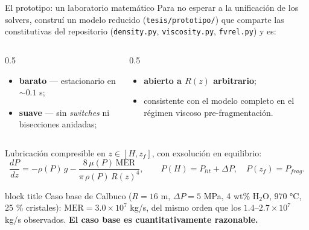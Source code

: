 \documentclass[aspectratio=169,10pt,t]{beamer}
\newcommand{\MER}{\mathrm{MER}}
\newcommand{\mensaje}[1]{%
  \vfill
  \begin{beamercolorbox}[wd=\linewidth,sep=0.4em,rounded=true]{block title}
  \footnotesize #1
  \end{beamercolorbox}}
\begin{document}
\begin{frame}{El prototipo: un laboratorio matemático}
Para no esperar a la unificación de los solvers, construí un \alert{modelo
reducido} (\texttt{tesis/prototipo/}) que comparte las constitutivas del
repositorio (\texttt{density.py}, \texttt{viscosity.py}, \texttt{fvrel.py}) y es:
\medskip
\begin{columns}[T]
\begin{column}{0.5\textwidth}
\begin{itemize}\small
  \item[(i)] \textbf{barato} — estacionario en $\sim0.1$ s;
  \item[(ii)] \textbf{suave} — sin \emph{switches} ni bisecciones anidadas;
\end{itemize}
\end{column}
\begin{column}{0.5\textwidth}
\begin{itemize}\small
  \item[(iii)] \textbf{abierto a $R(z)$ arbitrario};
  \item[(iv)] consistente con el modelo completo en el régimen viscoso
    pre-fragmentación.
\end{itemize}
\end{column}
\end{columns}
\medskip
Lubricación compresible en $z\in[H,z_f]$, con exsolución en equilibrio:
$$\frac{dP}{dz}=-\rho(P)\,g-\frac{8\,\mu(P)\,\MER}{\pi\,\rho(P)\,R(z)^4},
\qquad P(H)=P_{lit}+\Delta P,\quad P(z_f)=P_{frag}.$$

\mensaje{Caso base de Calbuco ($R=16$ m, $\Delta P=5$ MPa, 4 wt\% H$_2$O,
970 °C, 25 \% cristales): $\MER=3.0\times10^{7}$ kg/s, del mismo orden que los
$1.4$–$2.7\times10^{7}$ kg/s observados. \textbf{El caso base es
cuantitativamente razonable.}}
\end{frame}
\end{document}
